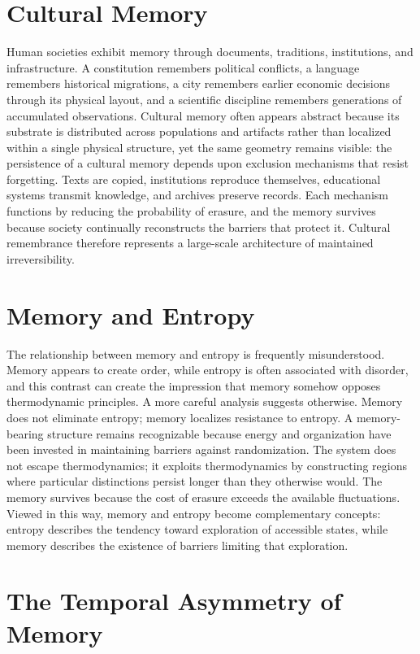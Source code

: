 \documentclass[11pt,oneside]{book}
\theoremstyle{plain}
\theoremstyle{definition}
\theoremstyle{remark}
\begin{document}
\section{Cultural Memory}

Human societies exhibit memory through documents, traditions, institutions, and infrastructure. A constitution remembers political conflicts, a language remembers historical migrations, a city remembers earlier economic decisions through its physical layout, and a scientific discipline remembers generations of accumulated observations. Cultural memory often appears abstract because its substrate is distributed across populations and artifacts rather than localized within a single physical structure, yet the same geometry remains visible: the persistence of a cultural memory depends upon exclusion mechanisms that resist forgetting. Texts are copied, institutions reproduce themselves, educational systems transmit knowledge, and archives preserve records. Each mechanism functions by reducing the probability of erasure, and the memory survives because society continually reconstructs the barriers that protect it. Cultural remembrance therefore represents a large-scale architecture of maintained irreversibility.

\section{Memory and Entropy}

The relationship between memory and entropy is frequently misunderstood. Memory appears to create order, while entropy is often associated with disorder, and this contrast can create the impression that memory somehow opposes thermodynamic principles. A more careful analysis suggests otherwise. Memory does not eliminate entropy; memory localizes resistance to entropy. A memory-bearing structure remains recognizable because energy and organization have been invested in maintaining barriers against randomization. The system does not escape thermodynamics; it exploits thermodynamics by constructing regions where particular distinctions persist longer than they otherwise would. The memory survives because the cost of erasure exceeds the available fluctuations. Viewed in this way, memory and entropy become complementary concepts: entropy describes the tendency toward exploration of accessible states, while memory describes the existence of barriers limiting that exploration.

\section{The Temporal Asymmetry of Memory}
\end{document}
